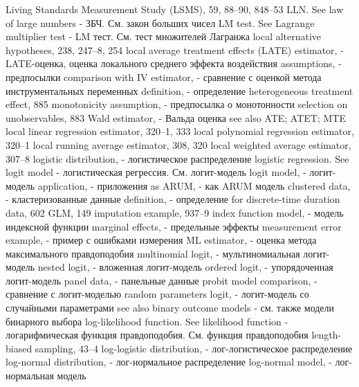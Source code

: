 Living Standards Measurement Study (LSMS), 59, 88–90, 848–53
LLN. See law of large numbers - ЗБЧ. См. закон больших чисел
LM test. See Lagrange multiplier test - LM тест. См. тест множителей Лагранжа
local alternative hypotheses, 238, 247–8, 254 
local average treatment effects (LATE) estimator, - LATE-оценка, оценка локального среднего эффекта воздействия
assumptions, - предпосылки
comparison with IV estimator, - сравнение с оценкой метода инструментальных переменных
definition, - определение
heterogeneous treatment effect, 885 
monotonicity assumption, - предпосылка о монотонности
selection on unobservables, 883 
Wald estimator, - Вальда оценка
see also ATE; ATET; MTE
local linear regression estimator, 320–1, 333 local polynomial regression estimator, 320–1 local running average estimator, 308, 320 local weighted average estimator, 307–8 
logistic distribution, - логистическое распределение
logistic regression. See logit model - логистическая регрессия. См. логит-модель
logit model, - логит-модель
application, - приложения
as ARUM, - как ARUM модель
clustered data, - кластеризованные данные
definition, - определение
for discrete-time duration data, 602 
GLM, 149
imputation example, 937–9
index function model, - модель индексной функции
marginal effects, - предельные эффекты
measurement error example, - пример с ошибками измерения
ML estimator, - оценка метода максимального правдоподобия
multinomial logit, - мультиномиальная логит-модель
nested logit, - вложенная логит-модель 
ordered logit, - упорядоченная логит-модель
panel data, - панельные данные
probit model comparison, - сравнение с логит-моделью
random parameters logit, - логит-модель со случайными параметрами
see also binary outcome models - см. также модели бинарного выбора
log-likelihood function. See likelihood function - логарифмическая функция правдоподобия. См. функция правдоподобия
length-biased sampling, 43–4
log-logistic distribution, - лог-логистическое распределение
log-normal distribution, - лог-нормальное распределение
log-normal model, - лог-нормальная модель

